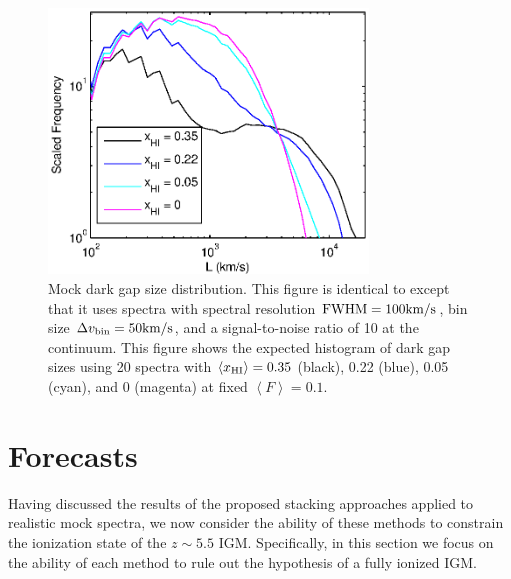\begin{figure}[!ht]
  \centering
  \includegraphics[width=8.5cm]{fig11.eps}
  \caption{Mock dark gap size distribution. This figure is identical to  except that it uses spectra with spectral resolution $\text{FWHM} = 100\text{km}/\text{s}$, bin size $\Delta v_{\text{bin}} = 50\text{km}/\text{s}$, and a signal-to-noise ratio of 10 at the continuum. This figure shows the expected histogram of dark gap sizes using 20 spectra with $\langle x_{\text{HI}}\rangle = 0.35$ (black), 0.22 (blue), 0.05 (cyan), and 0 (magenta) at fixed $\left\langle F \right\rangle = 0.1$.}
  \label{fig:DarkGapsResults}
\end{figure}



\section{Forecasts} \label{sec:NeutralIslandsForecasts}


Having discussed the results of the proposed stacking approaches applied to realistic mock spectra, we now consider the ability of these methods to constrain the ionization state of the $z \sim 5.5$ IGM. Specifically, in this section we focus on the ability of each method to rule out the hypothesis of a fully ionized IGM. 


